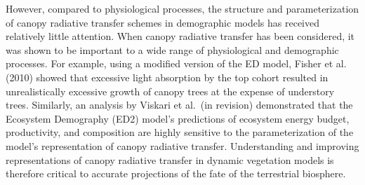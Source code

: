 However, compared to physiological processes, the structure and parameterization of canopy radiative transfer schemes in demographic models has received relatively little attention.
When canopy radiative transfer has been considered, it was shown to be important to a wide range of physiological and demographic processes.
For example, using a modified version of the ED model, Fisher et al. (2010)\nocite{fisher_2010_assessing} showed that excessive light absorption by the top cohort resulted in unrealistically excessive growth of canopy trees at the expense of understory trees.
Similarly, an analysis by Viskari et al.\ (in revision) \nocite{viskari_2019_influence} demonstrated that the Ecosystem Demography (ED2) model's predictions of ecosystem energy budget, productivity, and composition are highly sensitive to the parameterization of the model's representation of canopy radiative transfer.
Understanding and improving representations of canopy radiative transfer in dynamic vegetation models is therefore critical to accurate projections of the fate of the terrestrial biosphere.








